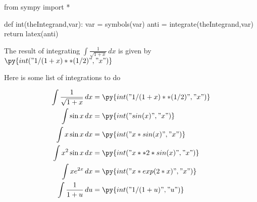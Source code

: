 \documentclass[11pt]{article}%
\begin{document}
 
 
 
\begin{pycode} 
 
from sympy import * 
 
def int(theIntegrand,var): 
    var  = symbols(var) 
    anti = integrate(theIntegrand,var) 
    return latex(anti) 
 
\end{pycode} 
 
The result of integrating $\int \frac{1}{\sqrt{ 1+x }} \, dx$ is given by $\py{int("1/(1+x)**(1/2)","x")}$ 
 
Here is some list of integrations to do 
 
\begin{align*} 
\int \frac{1}{\sqrt{ 1+x }} \, dx &=  \py{int("1/(1+x)**(1/2)","x")} \\ 
\int \sin x \, dx &=  \py{int("sin(x)","x")} \\ 
\int x \sin x \, dx &=  \py{int("x*sin(x)","x")} \\ 
\int x^2 \sin x \, dx &=  \py{int("x**2 * sin(x)","x")} \\ 
\int x e^{2 x} \, dx &=  \py{int("x*exp(2*x)","x")} \\ 
\int \frac{1}{1+u} \, du &=  \py{int("1/(1+u)","u")} \\ 
\end{align*} 
 
\end{document}
